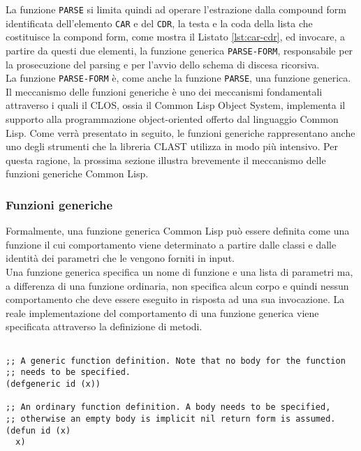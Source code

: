 La funzione \texttt{PARSE} si limita quindi ad operare l'estrazione dalla
compound form identificata dell’elemento \texttt{CAR} e del \texttt{CDR}, la
testa e la coda della lista che costituisce la compond form, come mostra il
Listato \ref{lst:car-cdr}, ed invocare, a partire da questi due elementi, la
funzione generica \texttt{PARSE-FORM}, responsabile per la prosecuzione del
parsing e per l'avvio dello schema di discesa ricorsiva.\\

La funzione \texttt{PARSE-FORM} è, come anche la funzione \texttt{PARSE}, una
funzione generica. Il meccanismo delle funzioni generiche è uno dei meccanismi
fondamentali attraverso i quali il CLOS, ossia il Common Lisp Object System,
implementa il supporto alla programmazione object-oriented offerto dal
linguaggio Common Lisp. Come verrà presentato in seguito, le funzioni generiche
rappresentano anche uno degli strumenti che la libreria CLAST utilizza in modo
più intensivo. Per questa ragione, la prossima sezione illustra brevemente il
meccanismo delle funzioni generiche Common Lisp.

\subsubsection{Funzioni generiche}

Formalmente, una funzione generica Common Lisp può essere definita come una
funzione il cui comportamento viene determinato a partire dalle classi e dalle
identità dei parametri che le vengono forniti in input.\\

Una funzione generica specifica un nome di funzione e una lista di parametri ma,
a differenza di una funzione ordinaria, non specifica alcun corpo e quindi
nessun comportamento che deve essere eseguito in risposta ad una sua
invocazione. La reale implementazione del comportamento di una funzione generica
viene specificata attraverso la definizione di metodi.

\begin{lstlisting}[caption=Confronto tra definizione di funzioni generiche e
ordinarie]

;; A generic function definition. Note that no body for the function
;; needs to be specified.
(defgeneric id (x))

;; An ordinary function definition. A body needs to be specified,
;; otherwise an empty body is implicit nil return form is assumed.
(defun id (x)
  x)

\end{lstlisting}

